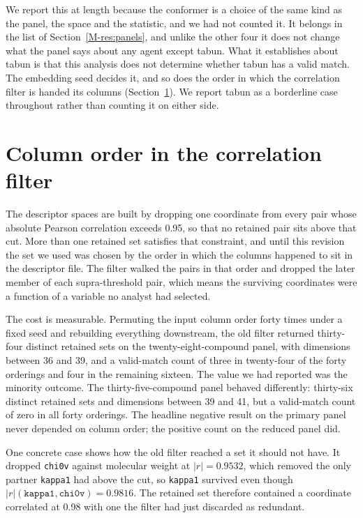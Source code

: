 \documentclass[11pt,a4paper]{article}
\begin{document}
We report this at length because the conformer is a choice of the same kind as
the panel, the space and the statistic, and we had not counted it. It belongs in
the list of Section~\ref{M-res:panels}, and unlike the other four it does not
change what the panel says about any agent except tabun. What it establishes
about tabun is that this analysis does not determine whether tabun has a valid
match. The embedding seed decides it, and so does the order in which the
correlation filter is handed its columns
(Section~\ref{meth:orderinvariance}). We report tabun as a borderline case
throughout rather than counting it on either side.

\section{Column order in the correlation filter}
\label{meth:orderinvariance}

The descriptor spaces are built by dropping one coordinate from every pair whose
absolute Pearson correlation exceeds 0.95, so that no retained pair sits above
that cut. More than one retained set satisfies that constraint, and until this
revision the set we used was chosen by the order in which the columns happened
to sit in the descriptor file. The filter walked the pairs in that order and
dropped the later member of each supra-threshold pair, which means the surviving
coordinates were a function of a variable no analyst had selected.

The cost is measurable. Permuting the input column order forty times under a
fixed seed and rebuilding everything downstream, the old filter returned
thirty-four distinct retained sets on the twenty-eight-compound panel, with
dimensions between 36 and 39, and a valid-match count of three in twenty-four
of the forty orderings and four in the remaining sixteen. The value we had
reported was the minority outcome. The thirty-five-compound panel behaved
differently: thirty-six distinct retained sets and dimensions between 39 and 41,
but a valid-match count of zero in all forty orderings. The headline negative
result on the primary panel never depended on column order; the positive count
on the reduced panel did.

One concrete case shows how the old filter reached a set it should not have. It
dropped \texttt{chi0v} against molecular weight at $|r| = 0.9532$, which removed
the only partner \texttt{kappa1} had above the cut, so \texttt{kappa1} survived
even though $|r|(\texttt{kappa1}, \texttt{chi0v}) = 0.9816$. The retained set
therefore contained a coordinate correlated at 0.98 with one the filter had just
discarded as redundant.
\end{document}
